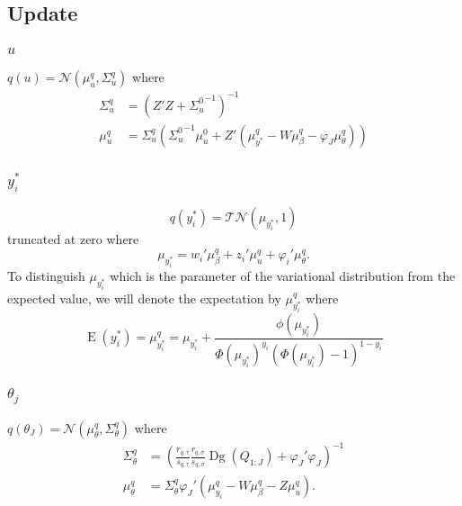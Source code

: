 \documentclass[11pt]{article}
\newcommand{\opn}{\operatorname}
\begin{document}
\subsection{Update}
\subsubsection{$u$}
$q\left(u\right) = \mathcal{N}\left(\mu_{u}^{q}, \Sigma_{u}^{q}\right)$ where
\begin{align*}
  \Sigma_{u}^{q} &= \left(Z'Z+{\Sigma_{u}^{0}}^{-1}\right)^{-1}\\
  \mu_{u}^{q} &= \Sigma_{u}^{q}\left({\Sigma_{u}^{0}}^{-1}\mu_{u}^{0} + Z'\left(\mu_{y^{*}}^{q} - W\mu_{\beta}^{q}-\varphi_{J}\mu_{\theta}^{q}\right)\right)
\end{align*}
\subsubsection{$y_{i}^{*}$}
\begin{equation*}
  q\left(y_{i}^{*}\right) = \mathcal{TN}\left(\mu_{y_{i}^{*}}, 1\right)
\end{equation*}
truncated at zero where
\begin{equation*}
  \mu_{y_{i}^{*}} = w_{i}'\mu_{\beta}^{q} + z_{i}'\mu_{u}^{q} + \varphi_{i}'\mu_{\theta}^{q}.
\end{equation*}
To distinguish $\mu_{y_{i}^{*}}$ which is the parameter of the variational distribution from the expected value, we will denote the expectation by $\mu_{y_{i}^{*}}^{q}$ where
\begin{equation*}
  \opn{E}\left(y_{i}^{*}\right) = \mu_{y_{i}^{*}}^{q} = \mu_{y_{i}^{*}} + \frac{\phi\left(\mu_{y_{i}^{*}}\right)}{\Phi\left(\mu_{y_{i}^{*}}\right)^{y_{i}}\left(\Phi\left(\mu_{y_{i}^{*}}\right)-1\right)^{1-y_{i}}}
\end{equation*}
\subsubsection{$\theta_{j}$}
$q\left(\theta_{J}\right) = \mathcal{N}\left(\mu_{\theta}^{q}, \Sigma_{\theta}^{q}\right)$ where
\begin{align*}
  \Sigma_{\theta}^{q} &= \left(\frac{r_{q,\tau}}{s_{q,\tau}}\frac{r_{q,\sigma}}{s_{q,\sigma}}\opn{Dg}\left(Q_{1:J}\right) + \varphi_{J}'\varphi_{J}\right)^{-1}\\
  \mu_{\theta}^{q} &= \Sigma_{\theta}^{q}\varphi_{J}'\left(\mu_{y_{i}}^{q} - W\mu_{\beta}^{q}-Z\mu_{u}^{q}\right).
\end{align*}
\end{document}
